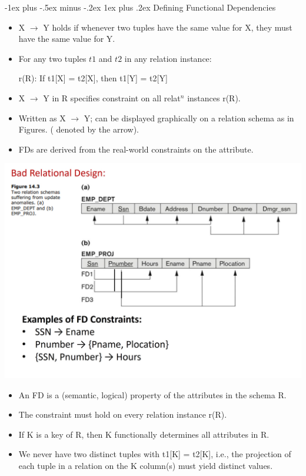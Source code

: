 \documentclass[12pt, landscape]{article}
\makeatletter
\renewcommand{\subsubsection}{\@startsection{subsubsection}{3}{0.1mm}%
                                {-1ex plus -.5ex minus -.2ex}%
                                {1ex plus .2ex}%
                                {\normalfont\small\bfseries}}
\makeatother
\begin{document}
\begin{multicols*}{3}
\subsubsection{Defining Functional Dependencies}
\begin{itemize}
\item X $\rightarrow$ Y holds if whenever two tuples have the same value 
for X, they must have the same value for Y.
\item For any two tuples $t1$ and $t2$ in any relation instance:
\centerline{r(R): If t1[X] = t2[X], then t1[Y] = t2[Y]}
\item X $\rightarrow$ Y in R specifies constraint on all relat$^n$ instances r(R).
\item Written as X $\rightarrow$ Y; can be displayed graphically on a 
relation schema as in Figures. ( denoted by the arrow).
\item FDs are derived from the real-world constraints on the attribute.
\end{itemize}
\centerline{\includegraphics[width = 0.9\linewidth]{FD-1}}
\begin{itemize}
\item An FD is a (semantic, logical) property of the attributes in the schema R.
\item The constraint must hold on every relation instance r(R).
\item If K is a key of R, then K functionally determines all attributes in R.
\item We never have two distinct tuples with t1[K] = t2[K], i.e., the projection of each tuple in a relation on the K column(s) must yield distinct values.
\end{itemize}


\end{multicols*}
\end{document}
